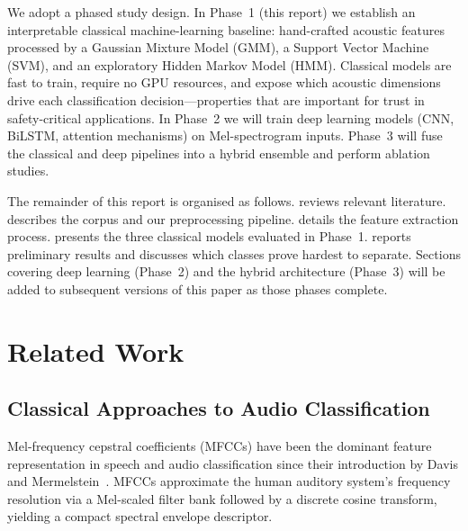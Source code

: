\documentclass[conference]{IEEEtran}
\begin{document}
We adopt a phased study design.  In Phase~1 (this report) we establish
an interpretable classical machine-learning baseline: hand-crafted
acoustic features processed by a Gaussian Mixture Model (GMM), a Support
Vector Machine (SVM), and an exploratory Hidden Markov Model (HMM).
Classical models are fast to train, require no GPU resources, and expose
which acoustic dimensions drive each classification decision---properties
that are important for trust in safety-critical applications.  In
Phase~2 we will train deep learning models (CNN, BiLSTM, attention
mechanisms) on Mel-spectrogram inputs.  Phase~3 will fuse the classical
and deep pipelines into a hybrid ensemble and perform ablation studies.

The remainder of this report is organised as follows.
 reviews relevant literature.
 describes the corpus and our preprocessing pipeline.
 details the feature extraction process.
 presents the three classical models evaluated in
Phase~1.   reports preliminary results and discusses
which classes prove hardest to separate.  Sections covering deep
learning (Phase~2) and the hybrid architecture (Phase~3) will be added
to subsequent versions of this paper as those phases complete.

\section{Related Work}
\label{sec:related}

\subsection{Classical Approaches to Audio Classification}
\label{sec:related_classical}

Mel-frequency cepstral coefficients (MFCCs) have been the dominant
feature representation in speech and audio classification since their
introduction by Davis and Mermelstein~\cite{davis1980mfcc}.  MFCCs
approximate the human auditory system's frequency resolution via a
Mel-scaled filter bank followed by a discrete cosine transform, yielding
a compact spectral envelope descriptor.
\end{document}
